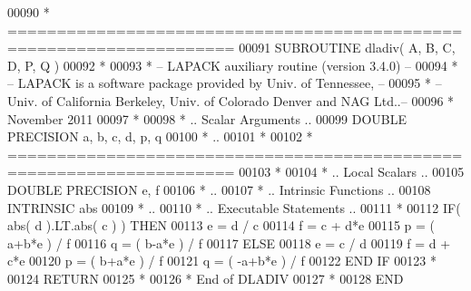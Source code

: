 \begin{DoxyCode}
00090 \textcolor{comment}{*  =====================================================================}
00091 \textcolor{keyword}{      SUBROUTINE }dladiv( A, B, C, D, P, Q )
00092 \textcolor{comment}{*}
00093 \textcolor{comment}{*  -- LAPACK auxiliary routine (version 3.4.0) --}
00094 \textcolor{comment}{*  -- LAPACK is a software package provided by Univ. of Tennessee,    --}
00095 \textcolor{comment}{*  -- Univ. of California Berkeley, Univ. of Colorado Denver and NAG Ltd..--}
00096 \textcolor{comment}{*     November 2011}
00097 \textcolor{comment}{*}
00098 \textcolor{comment}{*     .. Scalar Arguments ..}
00099       \textcolor{keywordtype}{DOUBLE PRECISION}   a, b, c, d, p, q
00100 \textcolor{comment}{*     ..}
00101 \textcolor{comment}{*}
00102 \textcolor{comment}{*  =====================================================================}
00103 \textcolor{comment}{*}
00104 \textcolor{comment}{*     .. Local Scalars ..}
00105       \textcolor{keywordtype}{DOUBLE PRECISION}   e, f
00106 \textcolor{comment}{*     ..}
00107 \textcolor{comment}{*     .. Intrinsic Functions ..}
00108       \textcolor{keywordtype}{INTRINSIC}          abs
00109 \textcolor{comment}{*     ..}
00110 \textcolor{comment}{*     .. Executable Statements ..}
00111 \textcolor{comment}{*}
00112       \textcolor{keywordflow}{IF}( abs( d ).LT.abs( c ) ) \textcolor{keywordflow}{THEN}
00113          e = d / c
00114          f = c + d*e
00115          p = ( a+b*e ) / f
00116          q = ( b-a*e ) / f
00117       \textcolor{keywordflow}{ELSE}
00118          e = c / d
00119          f = d + c*e
00120          p = ( b+a*e ) / f
00121          q = ( -a+b*e ) / f
00122 \textcolor{keywordflow}{      END IF}
00123 \textcolor{comment}{*}
00124       \textcolor{keywordflow}{RETURN}
00125 \textcolor{comment}{*}
00126 \textcolor{comment}{*     End of DLADIV}
00127 \textcolor{comment}{*}
00128 \textcolor{keyword}{      END}
\end{DoxyCode}
